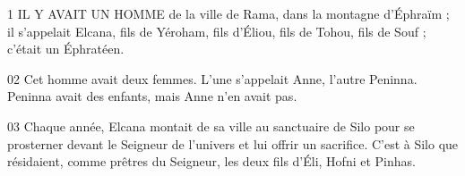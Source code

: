 1 IL Y AVAIT UN HOMME de la ville de Rama, dans la montagne d’Éphraïm ; il s’appelait Elcana, fils de Yéroham, fils d’Éliou, fils de Tohou, fils de Souf ; c’était un Éphratéen.

02 Cet homme avait deux femmes. L’une s’appelait Anne, l’autre Peninna. Peninna avait des enfants, mais Anne n’en avait pas.

03 Chaque année, Elcana montait de sa ville au sanctuaire de Silo pour se prosterner devant le Seigneur de l’univers et lui offrir un sacrifice. C’est à Silo que résidaient, comme prêtres du Seigneur, les deux fils d’Éli, Hofni et Pinhas.
